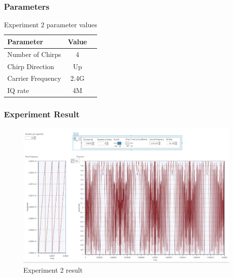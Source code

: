     \subsubsection*{Parameters}
    \begin{table}[!h]\centering
        \hspace{10mm}
        \begin{tabular}{|l|c|c|}
        \hline
        \multicolumn{1}{|l|}{Parameter} & \multicolumn{1}{l|}{Value} \\
        \hline
        Number of Chirps & 4 \\ 
        \hline
        Chirp Direction & Up \\ 
        \hline
        Carrier Frequency & 2.4G \\ 
        \hline
        IQ rate & 4M \\ 
        \hline
        \end{tabular}
        \caption{Experiment 2 parameter values}
    \end{table}
    
    \subsubsection*{Experiment Result}
    \vspace{-4mm}  
    \begin{figure}[!h]\raggedleft
    \hspace{15mm}
		\includegraphics[width=.95\textwidth]{image/week03/2-2-1.png}
		\caption{\footnotesize Experiment 2 result}
		\vspace{-10pt}
    \end{figure}
\clearpage
